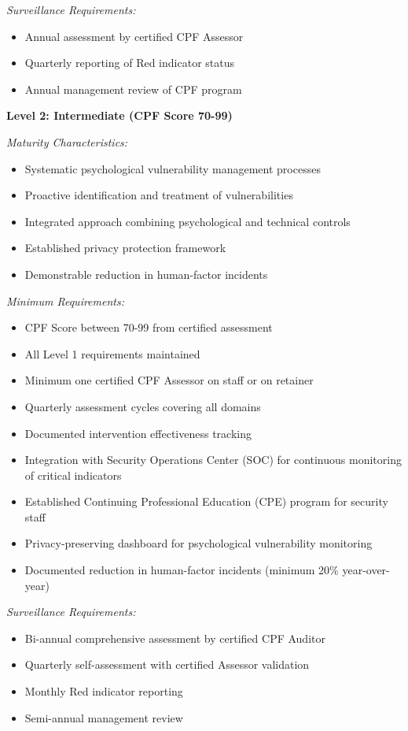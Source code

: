 \documentclass[11pt,a4paper]{article}
\begin{document}
\textit{Surveillance Requirements:}
\begin{itemize}
\item Annual assessment by certified CPF Assessor
\item Quarterly reporting of Red indicator status
\item Annual management review of CPF program
\end{itemize}

\textbf{Level 2: Intermediate (CPF Score 70-99)}

\textit{Maturity Characteristics:}
\begin{itemize}
\item Systematic psychological vulnerability management processes
\item Proactive identification and treatment of vulnerabilities
\item Integrated approach combining psychological and technical controls
\item Established privacy protection framework
\item Demonstrable reduction in human-factor incidents
\end{itemize}

\textit{Minimum Requirements:}
\begin{itemize}
\item CPF Score between 70-99 from certified assessment
\item All Level 1 requirements maintained
\item Minimum one certified CPF Assessor on staff or on retainer
\item Quarterly assessment cycles covering all domains
\item Documented intervention effectiveness tracking
\item Integration with Security Operations Center (SOC) for continuous monitoring of critical indicators
\item Established Continuing Professional Education (CPE) program for security staff
\item Privacy-preserving dashboard for psychological vulnerability monitoring
\item Documented reduction in human-factor incidents (minimum 20\% year-over-year)
\end{itemize}

\textit{Surveillance Requirements:}
\begin{itemize}
\item Bi-annual comprehensive assessment by certified CPF Auditor
\item Quarterly self-assessment with certified Assessor validation
\item Monthly Red indicator reporting
\item Semi-annual management review
\end{itemize}
\end{document}
